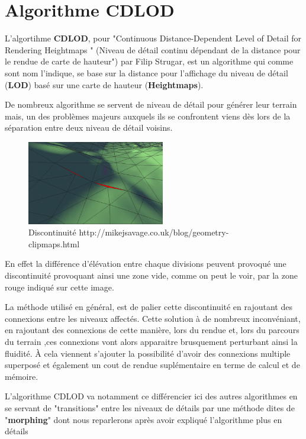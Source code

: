 \documentclass[12pt]{report}
\begin{document}
  \chapter{Algorithme CDLOD}
  
  L'algortihme \textbf{CDLOD}, pour "Continuous Distance-Dependent Level of Detail for Rendering Heightmaps " 
  (Niveau de détail continu dépendant de la distance pour le rendue de carte de hauteur") par Filip Strugar, 
  est un algorithme qui comme sont nom l'indique, se base sur la distance pour l'affichage du niveau de détail 
  (\textbf{LOD}) basé sur une carte de hauteur (\textbf{Heightmaps}).
  
  De nombreux algorithme se servent de niveau de détail pour générer leur terrain mais,
   un des problèmes majeurs auxquels ils se confrontent viens dès lors de la séparation entre deux niveau de détail voisins.\\
  \begin{figure}
  \includegraphics[width=6cm]{img/seams.png}
    \caption{Discontinuité http://mikejsavage.co.uk/blog/geometry-clipmaps.html}
    \label{fig:seams}
  \end{figure}
  
  \vspace{0.5cm}
  En effet la différence d'élévation entre chaque divisions peuvent provoqué une discontinuité provoquant ainsi une zone vide, 
  comme on peut le voir, par la zone rouge indiqué sur cette image. 
  
  
  \vspace{2.8cm}
  La méthode utilisé en général, est de palier cette discontinuité en rajoutant des connexions entre les niveaux affectés. 
  Cette solution à de nombreux inconvéniant, en rajoutant des connexions de cette manière, lors du rendue et, 
  lors du parcours du terrain ,ces connexions vont alors apparaitre brusquement perturbant ainsi la fluidité. 
  À cela viennent s'ajouter la possibilité d'avoir des connexions multiple superposé et également 
  un cout de rendue suplémentaire en terme de calcul et de mémoire.
  
  L'algorithme CDLOD va notamment ce différencier ici des autres algorithmes en se servant de "transitions" entre les niveaux de détails 
  par une méthode dites de "\textbf{morphing}" dont nous reparlerons après avoir expliqué l'algorithme plus en détails
  
\end{document}

